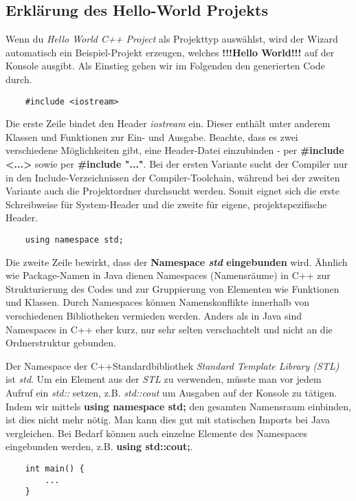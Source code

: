 \subsection{Erklärung des Hello-World Projekts}
Wenn du \emph{Hello World C++ Project} als Projekttyp auswählst, wird der Wizard automatisch ein Beispiel-Projekt erzeugen, welches \textbf{!!!Hello World!!!} auf der Konsole ausgibt.
Als Einstieg gehen wir im Folgenden den generierten Code durch.

\begin{lstlisting}
	#include <iostream>
\end{lstlisting}

Die erste Zeile bindet den Header \emph{iostream} ein.
Dieser enthält unter anderem Klassen und Funktionen zur Ein- und Ausgabe.
Beachte, dass es zwei verschiedene Möglichkeiten gibt, eine Header-Datei einzubinden -  per \textbf{\#include <...>} sowie per \textbf{\#include "..."}. Bei der ersten Variante sucht der Compiler nur in den Include-Verzeichnissen der Compiler-Toolchain, während bei der zweiten Variante auch die Projektordner durchsucht werden. Somit eignet sich die erste Schreibweise für System-Header und die zweite für eigene, projektspezifische Header.

\begin{lstlisting}
	using namespace std;
\end{lstlisting}
Die zweite Zeile bewirkt, dass der \textbf{Namespace \emph{std} eingebunden} wird. Ähnlich wie Package-Namen in Java dienen Namespaces (Namensräume) in C++ zur Strukturierung des Codes und zur Gruppierung von Elementen wie Funktionen und Klassen.
Durch Namespaces können Namenskonflikte innerhalb von verschiedenen Bibliotheken vermieden werden.
Anders als in Java sind Namespaces in C++ eher kurz, nur sehr selten verschachtelt und nicht an die Ordnerstruktur gebunden.


Der Namespace der C++Standardbibliothek \emph{Standard Template Library (STL)} ist \emph{std}. 
Um ein Element aus der \emph{STL} zu verwenden, müsste man vor jedem Aufruf ein \emph{std::} setzen, z.B. \emph{std::cout} um Ausgaben auf der Konsole zu tätigen.
Indem wir mittels \textbf{using namespace std;} den gesamten Namensraum einbinden, ist dies nicht mehr nötig.
Man kann dies gut mit statischen Imports bei Java vergleichen.
Bei Bedarf können auch einzelne Elemente des Namespaces eingebunden werden, z.B. \textbf{using std::cout;}.

\begin{lstlisting}
	int main() {
		...
	}
\end{lstlisting}

